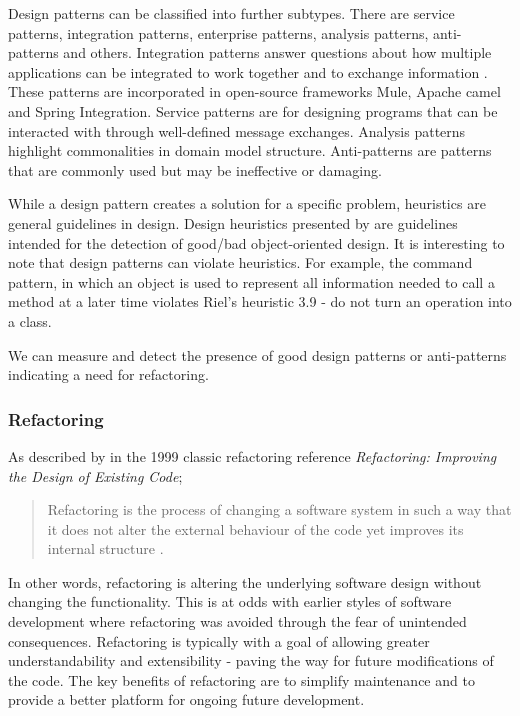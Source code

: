 Design patterns can be classified into further subtypes. There are service patterns, integration patterns, enterprise patterns, analysis patterns, anti-patterns and others. Integration patterns answer questions about how multiple applications can be integrated to work together and to exchange information \citep{fowler03}. These patterns are incorporated in open-source frameworks Mule, Apache camel and Spring Integration. Service patterns are for designing programs that can be interacted with through well-defined message exchanges. Analysis patterns highlight commonalities in domain model structure. Anti-patterns are patterns that are commonly used but may be ineffective or damaging.


While a design pattern creates a solution for a specific problem, heuristics are general guidelines in design. Design heuristics presented by \citet{riel96} are guidelines intended for the detection of good/bad object-oriented design. It is interesting to note that design patterns can violate heuristics. For example, the command pattern, in which an object is used to represent all information needed to call a method at a later time violates Riel's heuristic 3.9 - do not turn an operation into a class. %

We can measure and detect the presence of good design patterns or anti-patterns indicating a need for refactoring.

\subsubsection{Refactoring}

As described by \citeauthor{fowler99} in the 1999 classic refactoring reference \textit{Refactoring: Improving the Design of Existing Code};

\begin{quote}
Refactoring is the process of changing a software system in such a way that it does not alter the external behaviour of the code yet improves its internal structure \citep[pg.~xvi]{fowler99}.
\end{quote} 

In other words, refactoring is altering the underlying software design without changing the functionality. This is at odds with earlier styles of software development where refactoring was avoided through the fear of unintended consequences. Refactoring is typically with a goal of allowing greater understandability and extensibility - paving the way for future modifications of the code. The key benefits of refactoring are to simplify maintenance and to provide a better platform for ongoing future development. 

